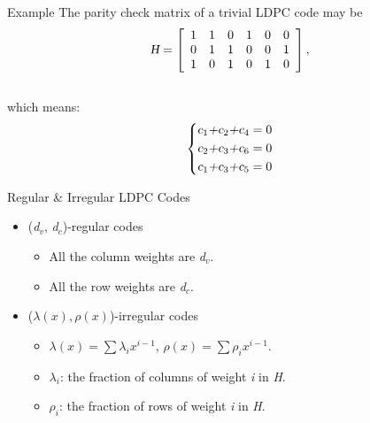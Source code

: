 \def\CTeXPreproc{Created by ctex v0.2.12, don't edit!}\documentclass{beamer}
\newcommand{\xieti}{\textsl}
\begin{document}
\begin{frame}
    \begin{block}{Example}
        The parity check matrix of a trivial LDPC code may be
        \[
            \xieti{H}=
            \left[
            \begin{array}[]{cccccc}
            1 & 1 & 0 & 1 & 0 & 0 \\
            0 & 1 & 1 & 0 & 0 & 1 \\
            1 & 0 & 1 & 0 & 1 & 0
            \end{array}
            \right],
        \]\\
        which means:
        \begin{equation*}
            \left\{
            \begin{aligned}
            \xieti{c$_1$+c$_2$+c$_4$} = 0\\
            \xieti{c$_2$+c$_3$+c$_6$} = 0\\
            \xieti{c$_1$+c$_3$+c$_5$} = 0
            \end{aligned} \right.
        \end{equation*}
    \end{block}
\end{frame}

\begin{frame}
    \begin{block}{Regular \& Irregular LDPC Codes}
        \begin{itemize}
            \item(\xieti{d$_v$},  \xieti{d$_c$})-regular codes
                \begin{itemize}
                    \item All the column weights are \xieti{d$_v$}.
                    \item All the row weights are \xieti{d$_c$}.
                \end{itemize}
            \item ($\lambda(x), \rho(x)$)-irregular codes
                \begin{itemize}
                    \item  $\lambda(x) = \sum \lambda_ix^{i-1}$, $\rho(x) = \sum \rho_ix^{i-1}$.
                    \item $\lambda_i$: the fraction of columns of weight \xieti{i} in \xieti{H}.
                    \item $\rho_i$: the fraction of rows of weight \xieti{i} in \xieti{H}.
                \end{itemize}
        \end{itemize}
    \end{block}
\end{frame}
\end{document}
